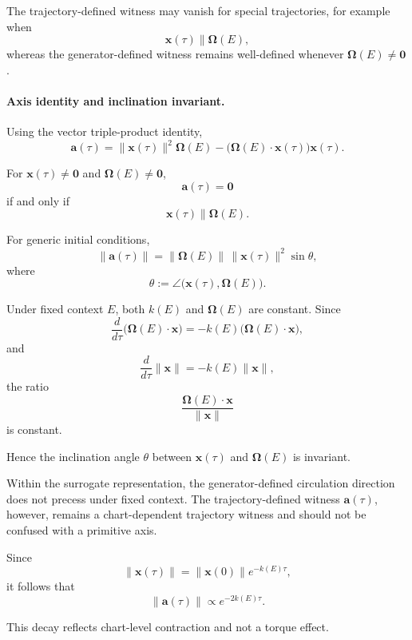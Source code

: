 \documentclass[aps,prx,onecolumn,11pt]{revtex4-2}
\theoremstyle{plain}
\theoremstyle{definition}
\theoremstyle{remark}
\begin{document}
The trajectory-defined witness may vanish for special trajectories, for
example when
\[
\mathbf x(\tau)\parallel\boldsymbol{\Omega}(E),
\]
whereas the generator-defined witness remains well-defined whenever
\(\boldsymbol{\Omega}(E)\neq\mathbf 0\).

\paragraph{Axis identity and inclination invariant.}

Using the vector triple-product identity,
\begin{equation}
\mathbf a(\tau)
=
\|\mathbf x(\tau)\|^2
\boldsymbol{\Omega}(E)
-
\bigl(
\boldsymbol{\Omega}(E)\cdot
\mathbf x(\tau)
\bigr)
\mathbf x(\tau).
\label{eq:toy_axis_proxy_identity}
\end{equation}

For \(\mathbf x(\tau)\neq\mathbf 0\) and
\(\boldsymbol{\Omega}(E)\neq\mathbf 0\),
\[
\mathbf a(\tau)=\mathbf 0
\]
if and only if
\[
\mathbf x(\tau)\parallel\boldsymbol{\Omega}(E).
\]

For generic initial conditions,
\[
\|\mathbf a(\tau)\|
=
\|\boldsymbol{\Omega}(E)\|\,
\|\mathbf x(\tau)\|^2
\sin\theta,
\]
where
\[
\theta
:=
\angle
\bigl(
\mathbf x(\tau),
\boldsymbol{\Omega}(E)
\bigr).
\]

Under fixed context \(E\), both \(k(E)\) and
\(\boldsymbol{\Omega}(E)\) are constant. Since
\[
\frac{d}{d\tau}
\bigl(
\boldsymbol{\Omega}(E)\cdot\mathbf x
\bigr)
=
-k(E)
\bigl(
\boldsymbol{\Omega}(E)\cdot\mathbf x
\bigr),
\]
and
\[
\frac{d}{d\tau}
\|\mathbf x\|
=
-k(E)\|\mathbf x\|,
\]
the ratio
\[
\frac{
\boldsymbol{\Omega}(E)\cdot\mathbf x
}{
\|\mathbf x\|
}
\]
is constant.

Hence the inclination angle \(\theta\) between
\(\mathbf x(\tau)\) and \(\boldsymbol{\Omega}(E)\) is invariant.

Within the surrogate representation, the generator-defined circulation
direction does not precess under fixed context. The
trajectory-defined witness \(\mathbf a(\tau)\), however, remains a
chart-dependent trajectory witness and should not be confused with a
primitive axis.

Since
\[
\|\mathbf x(\tau)\|
=
\|\mathbf x(0)\|
e^{-k(E)\tau},
\]
it follows that
\begin{equation}
\|\mathbf a(\tau)\|
\propto
e^{-2k(E)\tau}.
\label{eq:toy_axis_mag_decay}
\end{equation}

This decay reflects chart-level contraction and not a torque effect.
\end{document}
